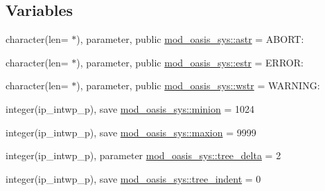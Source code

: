 \subsection*{Variables}
\begin{DoxyCompactItemize}
\item 
character(len= $\ast$), parameter, public \hyperlink{namespacemod__oasis__sys_aad26202d309c5b33de4cddb54c7edc99}{mod\+\_\+oasis\+\_\+sys\+::astr} = \textquotesingle{} A\+B\+O\+R\+T\+: \textquotesingle{}
\item 
character(len= $\ast$), parameter, public \hyperlink{namespacemod__oasis__sys_a0f6e0376585c6f39d653f5ab05e80e8f}{mod\+\_\+oasis\+\_\+sys\+::estr} = \textquotesingle{} E\+R\+R\+O\+R\+: \textquotesingle{}
\item 
character(len= $\ast$), parameter, public \hyperlink{namespacemod__oasis__sys_a4e16ba69c68a3a39c8b8aa3b92234ce1}{mod\+\_\+oasis\+\_\+sys\+::wstr} = \textquotesingle{} W\+A\+R\+N\+I\+N\+G\+: \textquotesingle{}
\item 
integer(ip\+\_\+intwp\+\_\+p), save \hyperlink{namespacemod__oasis__sys_aded42e42797afa8d6ee5bdefdf42a812}{mod\+\_\+oasis\+\_\+sys\+::minion} = 1024
\item 
integer(ip\+\_\+intwp\+\_\+p), save \hyperlink{namespacemod__oasis__sys_a9dc0e2d10d9e8e8c23e391467ae2eee4}{mod\+\_\+oasis\+\_\+sys\+::maxion} = 9999
\item 
integer(ip\+\_\+intwp\+\_\+p), parameter \hyperlink{namespacemod__oasis__sys_ad7e3af62b75730bc71be0df8ae50cf0a}{mod\+\_\+oasis\+\_\+sys\+::tree\+\_\+delta} = 2
\item 
integer(ip\+\_\+intwp\+\_\+p), save \hyperlink{namespacemod__oasis__sys_a159b60d106efcb1f42722b08c5511ad0}{mod\+\_\+oasis\+\_\+sys\+::tree\+\_\+indent} = 0
\end{DoxyCompactItemize}
